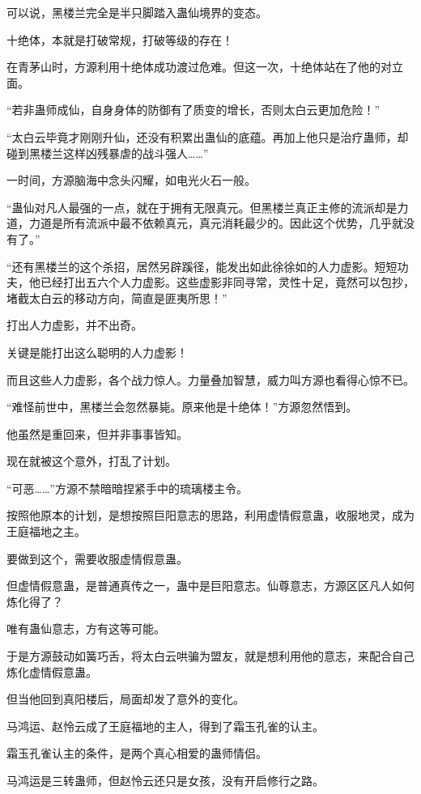 \begin{this_body}
可以说，黑楼兰完全是半只脚踏入蛊仙境界的变态。

十绝体，本就是打破常规，打破等级的存在！

在青茅山时，方源利用十绝体成功渡过危难。但这一次，十绝体站在了他的对立面。

“若非蛊师成仙，自身身体的防御有了质变的增长，否则太白云更加危险！”

“太白云毕竟才刚刚升仙，还没有积累出蛊仙的底蕴。再加上他只是治疗蛊师，却碰到黑楼兰这样凶残暴虐的战斗强人……”

一时间，方源脑海中念头闪耀，如电光火石一般。

“蛊仙对凡人最强的一点，就在于拥有无限真元。但黑楼兰真正主修的流派却是力道，力道是所有流派中最不依赖真元，真元消耗最少的。因此这个优势，几乎就没有了。”

“还有黑楼兰的这个杀招，居然另辟蹊径，能发出如此徐徐如的人力虚影。短短功夫，他已经打出五六个人力虚影。这些虚影非同寻常，灵性十足，竟然可以包抄，堵截太白云的移动方向，简直是匪夷所思！”

打出人力虚影，并不出奇。

关键是能打出这么聪明的人力虚影！

而且这些人力虚影，各个战力惊人。力量叠加智慧，威力叫方源也看得心惊不已。

“难怪前世中，黑楼兰会忽然暴毙。原来他是十绝体！”方源忽然悟到。

他虽然是重回来，但并非事事皆知。

现在就被这个意外，打乱了计划。

“可恶……”方源不禁暗暗捏紧手中的琉璃楼主令。

按照他原本的计划，是想按照巨阳意志的思路，利用虚情假意蛊，收服地灵，成为王庭福地之主。

要做到这个，需要收服虚情假意蛊。

但虚情假意蛊，是普通真传之一，蛊中是巨阳意志。仙尊意志，方源区区凡人如何炼化得了？

唯有蛊仙意志，方有这等可能。

于是方源鼓动如簧巧舌，将太白云哄骗为盟友，就是想利用他的意志，来配合自己炼化虚情假意蛊。

但当他回到真阳楼后，局面却发了意外的变化。

马鸿运、赵怜云成了王庭福地的主人，得到了霜玉孔雀的认主。

霜玉孔雀认主的条件，是两个真心相爱的蛊师情侣。

马鸿运是三转蛊师，但赵怜云还只是女孩，没有开启修行之路。


\end{this_body}
